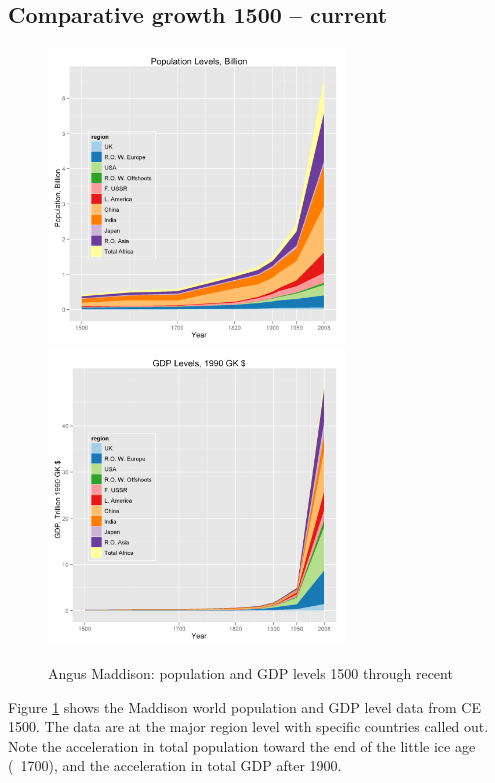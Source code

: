 \documentclass[12pt]{article}
\numberwithin{equation}{section}
\begin{document}
		\subsection{Comparative growth 1500 -- current}

		
 		\begin{figure}[h]
		\centerline{
		\mbox{\includegraphics[width=0.70\textwidth]{maddisonregpoplevels.png}}
		\mbox{\includegraphics[width=0.70\textwidth]{maddisonreggdplevels.png}}
		}
		\caption{Angus Maddison: population and GDP levels 1500 through recent}
		\label{fig:poplevel}
		\end{figure}
		
		Figure \ref{fig:poplevel} shows the Maddison world population and GDP level data from CE 1500. The data are at the major region level with specific countries called out.	Note the acceleration in total population toward the end of the little ice age (~1700), and the acceleration in total GDP after 1900.
		
\end{document}
